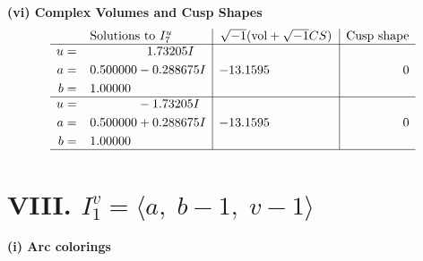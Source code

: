 \documentclass[1p]{elsarticle_modified}
\theoremstyle{definition}
\newcommand{\I}{\sqrt{-1}}
\begin{document}
\newpage\flushleft \textbf{(vi) Complex Volumes and Cusp Shapes}
$$\begin{array}{c|c|c}  
\text{Solutions to }I^u_{7}& \I (\text{vol} + \sqrt{-1}CS) & \text{Cusp shape}\\
 \hline 
\begin{aligned}
u &= \phantom{-0.000000 -}1.73205 I \\
a &= \phantom{-}0.500000 - 0.288675 I \\
b &= \phantom{-}1.00000\phantom{ +0.000000I}\end{aligned}
 & -13.1595\phantom{ +0.000000I} & \phantom{-0.000000 } 0 \\ \hline\begin{aligned}
u &= \phantom{-0.000000 } -1.73205 I \\
a &= \phantom{-}0.500000 + 0.288675 I \\
b &= \phantom{-}1.00000\phantom{ +0.000000I}\end{aligned}
 & -13.1595\phantom{ +0.000000I} & \phantom{-0.000000 } 0\\
 \hline 
 \end{array}$$\newpage\newpage\renewcommand{\arraystretch}{1}
\centering \section*{VIII. $I^v_{1}= \langle a,\;b-1,\;v-1 \rangle$}
\flushleft \textbf{(i) Arc colorings}\\
\end{document}

